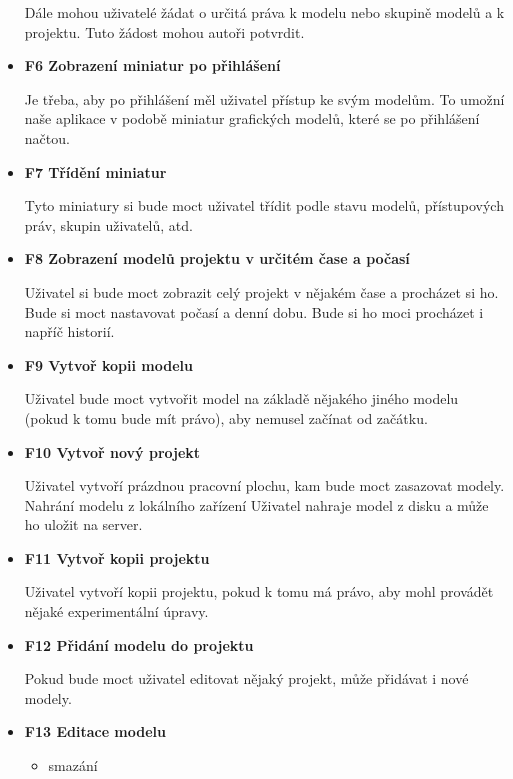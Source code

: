 \documentclass[thesis=B,czech]{FITthesis}[2012/06/26]
\begin{document}
\begin{itemize}
                Dále mohou uživatelé žádat o určitá práva k modelu nebo skupině modelů a k projektu. Tuto žádost mohou autoři potvrdit.
                \item \textbf{F6 Zobrazení miniatur po přihlášení}
                
                Je třeba, aby po přihlášení měl uživatel přístup ke svým modelům. To umožní naše aplikace v podobě miniatur grafických modelů, které se po přihlášení načtou.
                \item \textbf{F7 Třídění miniatur}
                
                Tyto miniatury si bude moct uživatel třídit podle stavu modelů, přístupových práv, skupin uživatelů, atd.
                \item \textbf{F8 Zobrazení modelů projektu v určitém čase a počasí}
                
                Uživatel si bude moct zobrazit celý projekt v nějakém čase a procházet si ho. Bude si moct nastavovat počasí a denní dobu. Bude si ho moci procházet i napříč historií.
                \item \textbf{F9 Vytvoř kopii modelu}
                
                Uživatel bude moct vytvořit model na základě nějakého jiného modelu (pokud k tomu bude mít právo), aby nemusel začínat od začátku.
                \item \textbf{F10 Vytvoř nový projekt}
                
                Uživatel vytvoří prázdnou pracovní plochu, kam bude moct zasazovat modely.
                Nahrání modelu z lokálního zařízení
                Uživatel nahraje model z disku a může ho uložit na server.
               \item \textbf{F11 Vytvoř kopii projektu}
               
                Uživatel vytvoří kopii projektu, pokud k tomu má právo, aby mohl provádět nějaké experimentální úpravy.
                \item \textbf{F12 Přidání modelu do projektu}
                
                Pokud bude moct uživatel editovat nějaký projekt, může přidávat i nové modely.
               \item \textbf{F13 Editace modelu}
               
               \begin{itemize}
                    \item smazání
                   

\end{itemize}
\end{itemize}
\end{document}
